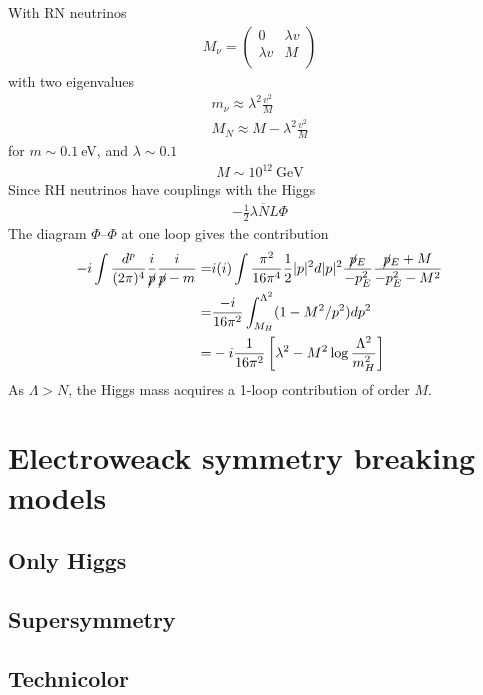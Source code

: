 \documentclass[12pt,letterpaper]{article}
\begin{document}
With RN neutrinos
\begin{align*}
  M_{\nu}=
  \begin{pmatrix}
    0 & \lambda v\\    
    \lambda v &M \\    
  \end{pmatrix}
\end{align*}
with two eigenvalues
\begin{align*}
  m_{\nu}\approx \lambda^2\frac{v^2}{M}\nonumber\\
 M_N\approx M-\lambda^2\frac{v^2}{M}
\end{align*}
for $m\sim 0.1\ $eV, and $\lambda\sim 0.1$
\begin{align*}
  M\sim 10^{12}\ \text{GeV}
\end{align*}
Since RH neutrinos have couplings with the Higgs
\begin{align*}
  -\frac{1}{2}\lambda \overline{N}L\Phi
\end{align*}
The diagram $\Phi$--$\Phi$ at one loop gives the contribution
\begin{align*}
  -i\int
  \frac{d^p}{(2\pi)^4}\frac{i}{\cancel{p}}\frac{i}{\cancel{p}-m}
=&i(i)\int
\frac{\pi^2}{16\pi^4}\frac{1}{2}|p|^2d|p|^2\frac{\cancel{p}_E}{-p_E^2}
\frac{\cancel{p}_E+M}{-p_E^2-M^2}\nonumber\\
=&\frac{-i}{16\pi^2}\int_{M_H}^{\Lambda^{2}}(1-M^2/p^2)dp^{2}\nonumber\\
=&-i \frac{1}{16\pi^2}\left[ \lambda^2-M^2\log \frac{\Lambda^2}{m_H^2} \right]
\end{align*}
As $\Lambda>N$, the Higgs mass acquires a 1-loop contribution of order $M$. 

\section{Electroweack symmetry breaking models}

\subsection{Only Higgs}
\subsection{Supersymmetry}

\subsection{Technicolor}
\end{document}
